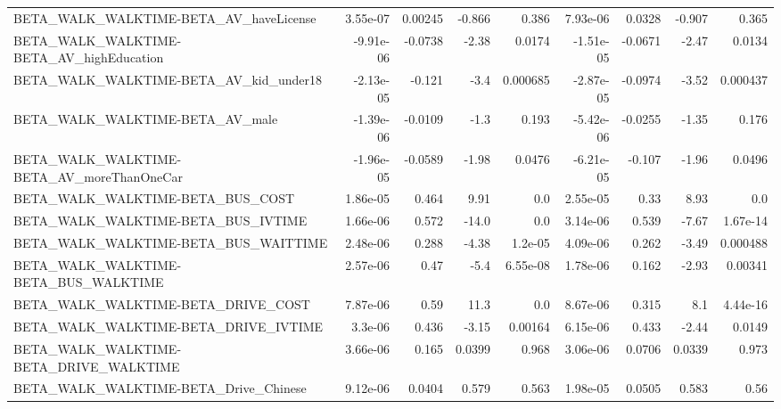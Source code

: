\begin{tabular}{lrrrrrrrr}
BETA\_WALK\_WALKTIME-BETA\_AV\_haveLicense             &    3.55e-07 &      0.00245 &   -0.866 &    0.386 &   7.93e-06 &      0.0328 &       -0.907 &         0.365 \\
BETA\_WALK\_WALKTIME-BETA\_AV\_highEducation           &   -9.91e-06 &      -0.0738 &    -2.38 &   0.0174 &  -1.51e-05 &     -0.0671 &        -2.47 &        0.0134 \\
BETA\_WALK\_WALKTIME-BETA\_AV\_kid\_under18             &   -2.13e-05 &       -0.121 &     -3.4 & 0.000685 &  -2.87e-05 &     -0.0974 &        -3.52 &      0.000437 \\
BETA\_WALK\_WALKTIME-BETA\_AV\_male                    &   -1.39e-06 &      -0.0109 &     -1.3 &    0.193 &  -5.42e-06 &     -0.0255 &        -1.35 &         0.176 \\
BETA\_WALK\_WALKTIME-BETA\_AV\_moreThanOneCar          &   -1.96e-05 &      -0.0589 &    -1.98 &   0.0476 &  -6.21e-05 &      -0.107 &        -1.96 &        0.0496 \\
BETA\_WALK\_WALKTIME-BETA\_BUS\_COST                   &    1.86e-05 &        0.464 &     9.91 &      0.0 &   2.55e-05 &        0.33 &         8.93 &           0.0 \\
BETA\_WALK\_WALKTIME-BETA\_BUS\_IVTIME                 &    1.66e-06 &        0.572 &    -14.0 &      0.0 &   3.14e-06 &       0.539 &        -7.67 &      1.67e-14 \\
BETA\_WALK\_WALKTIME-BETA\_BUS\_WAITTIME               &    2.48e-06 &        0.288 &    -4.38 &  1.2e-05 &   4.09e-06 &       0.262 &        -3.49 &      0.000488 \\
BETA\_WALK\_WALKTIME-BETA\_BUS\_WALKTIME               &    2.57e-06 &         0.47 &     -5.4 & 6.55e-08 &   1.78e-06 &       0.162 &        -2.93 &       0.00341 \\
BETA\_WALK\_WALKTIME-BETA\_DRIVE\_COST                 &    7.87e-06 &         0.59 &     11.3 &      0.0 &   8.67e-06 &       0.315 &          8.1 &      4.44e-16 \\
BETA\_WALK\_WALKTIME-BETA\_DRIVE\_IVTIME               &     3.3e-06 &        0.436 &    -3.15 &  0.00164 &   6.15e-06 &       0.433 &        -2.44 &        0.0149 \\
BETA\_WALK\_WALKTIME-BETA\_DRIVE\_WALKTIME             &    3.66e-06 &        0.165 &   0.0399 &    0.968 &   3.06e-06 &      0.0706 &       0.0339 &         0.973 \\
BETA\_WALK\_WALKTIME-BETA\_Drive\_Chinese              &    9.12e-06 &       0.0404 &    0.579 &    0.563 &   1.98e-05 &      0.0505 &        0.583 &          0.56 \\

\end{tabular}
